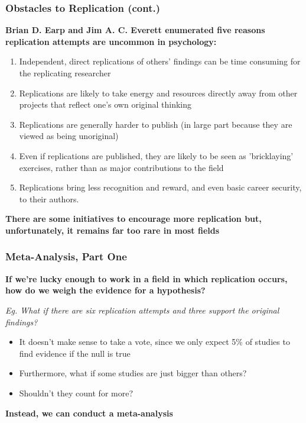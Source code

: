 \documentclass[10pt, block=fill]{beamer}
\begin{document}
\begin{frame}
    \frametitle{Obstacles to Replication (cont.)}

    \textbf{Brian D. Earp and Jim A. C. Everett enumerated five reasons replication attempts are uncommon in psychology:}
    \begin{enumerate}
        \item Independent, direct replications of others' findings can be time consuming for the replicating researcher
        \item Replications are likely to take energy and resources directly away from other projects that reflect one's own original thinking
        \item Replications are generally harder to publish (in large part because they are viewed as being unoriginal)
        \item Even if replications are published, they are likely to be seen as 'bricklaying' exercises, rather than as major contributions to the field
        \item Replications bring less recognition and reward, and even basic career security, to their authors.
    \end{enumerate}
    
    \textbf{There are some initiatives to encourage more replication but, unfortunately, it remains far too rare in most fields }
\end{frame}


\begin{frame}
    \frametitle{Meta-Analysis, Part One}
    
    \textbf{If we're lucky enough to work in a field in which replication occurs, how do we weigh the evidence for a hypothesis?}
    
    \textit{Eg. What if there are six replication attempts and three support the original findings?}
    
    \begin{itemize}
        \item It doesn't make sense to take a vote, since we only expect 5\% of studies to find evidence if the null is true
        \item Furthermore, what if some studies are just bigger than others? 
        \item Shouldn't they count for more?
    \end{itemize}
    
    \textbf{Instead, we can conduct a meta-analysis}
\end{frame}
\end{document}
